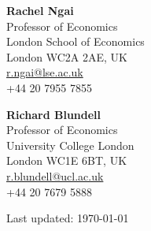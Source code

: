 \documentclass[11pt,a4paper]{article}
\begin{document}
\vspace{0.3cm}

\begin{minipage}[t]{0.48\textwidth}
\textbf{Rachel Ngai} \\
Professor of Economics \\
London School of Economics \\
London WC2A 2AE, UK \\
\href{mailto:r.ngai@lse.ac.uk}{r.ngai@lse.ac.uk} \\
+44 20 7955 7855
\end{minipage}
\hfill
\begin{minipage}[t]{0.48\textwidth}
\textbf{Richard Blundell} \\
Professor of Economics \\
University College London \\
London WC1E 6BT, UK \\
\href{mailto:r.blundell@ucl.ac.uk}{r.blundell@ucl.ac.uk} \\
+44 20 7679 5888
\end{minipage}

\vfill
\begin{center}
\small{Last updated: \today}
\end{center}
\end{document}
